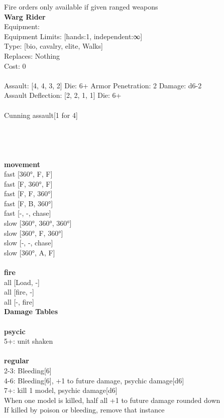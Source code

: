 \noindent Fire orders only available if given ranged weapons\\ 


{\bf Warg Rider } \\
Equipment:  \\
Equipment Limits: [hands:1, independent:∞] \\
Type: [bio, cavalry, elite, Walks] \\
Replaces: Nothing \\
Cost: 0\\
\ \\
Assault: [4, 4, 3, 2] Die: 6+ Armor Penetration: 2 Damage: d6-2 \\
Assault Deflection: [2, 2, 1, 1] Die: 6+\\
\\ 
Cunning assault[1 for 4]\\ 
 
\ \\

\ \\
 
\ \\



\ \\ {\bf movement } \\
fast [360°, F, F] \\
fast [F, 360°, F] \\
fast [F, F, 360°] \\
fast [F, B, 360°] \\
fast [-, -, chase] \\
slow [360°, 360°, 360°] \\
slow [360°, F, 360°] \\
slow [-, -, chase] \\
slow [360°, A, F] \\
\ \\ {\bf fire } \\
all [Load, -] \\
all [fire, -] \\
all [-, fire] \\


{\bf Damage Tables} \\
\ \\ {\bf psycic } \\
5+: unit shaken \\
\ \\ {\bf regular } \\
2-3: Bleeding[6] \\
4-6: Bleeding[6], +1 to future damage, psychic damage[d6] \\
7+: kill 1 model, psychic damage[d6] \\
When one model is killed, half all +1 to future damage rounded down \\
If killed by poison or bleeding, remove that instance \\










